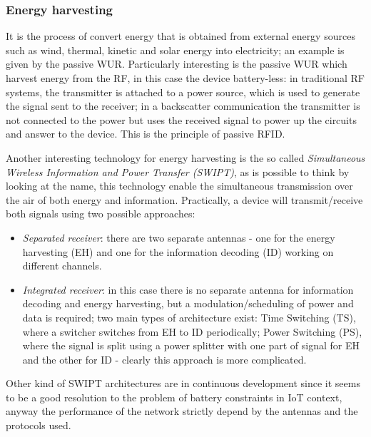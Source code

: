 \documentclass[sigconf]{acmart}
\begin{document}
    \subsubsection{Energy harvesting}
    It is the process of convert energy that is obtained from external energy sources such as wind, thermal, kinetic and solar energy into electricity; an example is given by the passive WUR. Particularly interesting is the passive WUR which harvest energy from the RF, in this case the device battery-less: in traditional RF systems, the transmitter is attached to a power source, which is used to generate the signal sent to the receiver; in a backscatter communication the transmitter is not connected to the power but uses the received signal to power up the circuits and answer to the device. This is the principle of passive RFID.
    
    Another interesting technology for energy harvesting is the so called \textit{Simultaneous Wireless Information and Power Transfer (SWIPT)}, as is possible to think by looking at the name, this technology enable the simultaneous transmission over the air of both energy and information. Practically, a device will transmit/receive both signals using two possible approaches:
    \begin{itemize}
    \item \textit{Separated receiver}: there are two separate antennas - one for the energy harvesting (EH) and one for the information decoding (ID) working on different channels.
    \item \textit{Integrated receiver}: in this case there is no separate antenna for information decoding and energy harvesting, but a modulation/scheduling of power and data is required; two main types of architecture exist: Time Switching (TS), where a switcher switches from EH to ID periodically; Power Switching (PS), where the signal is split using a power splitter with one part of signal for EH and the other for ID - clearly this approach is more complicated.
    \end{itemize}
     Other kind of SWIPT architectures are in continuous development since it seems to be a good resolution to the problem of battery constraints in IoT context, anyway the performance of the network strictly depend by the antennas and the protocols used.
\end{document}
